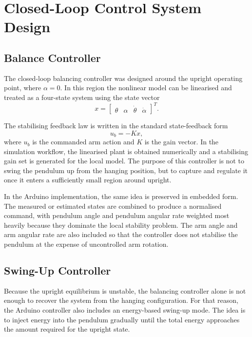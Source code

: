 \documentclass[conference]{IEEEtran}
\begin{document}
\section{Closed-Loop Control System Design}
\subsection{Balance Controller}
The closed-loop balancing controller was designed around the upright operating point, where $\alpha = 0$. In this region the nonlinear model can be linearised and treated as a four-state system using the state vector
\begin{equation}
x =
\begin{bmatrix}
\theta & \alpha & \dot{\theta} & \dot{\alpha}
\end{bmatrix}^{T}.
\end{equation}

The stabilising feedback law is written in the standard state-feedback form
\begin{equation}
u_{b} = -Kx,
\end{equation}
where $u_{b}$ is the commanded arm action and $K$ is the gain vector. In the simulation workflow, the linearised plant is obtained numerically and a stabilising gain set is generated for the local model. The purpose of this controller is not to swing the pendulum up from the hanging position, but to capture and regulate it once it enters a sufficiently small region around upright.

In the Arduino implementation, the same idea is preserved in embedded form. The measured or estimated states are combined to produce a normalised command, with pendulum angle and pendulum angular rate weighted most heavily because they dominate the local stability problem. The arm angle and arm angular rate are also included so that the controller does not stabilise the pendulum at the expense of uncontrolled arm rotation.

\subsection{Swing-Up Controller}
Because the upright equilibrium is unstable, the balancing controller alone is not enough to recover the system from the hanging configuration. For that reason, the Arduino controller also includes an energy-based swing-up mode. The idea is to inject energy into the pendulum gradually until the total energy approaches the amount required for the upright state.
\end{document}
